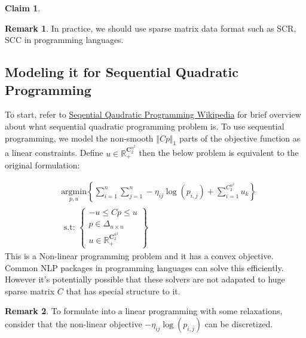 \documentclass[11pt]{article}
\theoremstyle{definition}
\newtheorem{claim}{Claim}[subsection]
\newtheorem{remark}{Remark}[subsection]
{
    \newtheorem{assumption}{Assumption}
}
\numberwithin{equation}{subsection}
\begin{document}
\begin{claim}
        \end{claim}
        \begin{remark}
            In practice, we should use sparse matrix data format such as SCR, SCC in programming languages. 
        \end{remark}
    \subsection{Modeling it for Sequential Quadratic Programming}
    \begin{linenumbers}
        To start, refer to \href{https://en.wikipedia.org/wiki/Sequential_quadratic_programming}{Seqential Qaudratic Programming Wikipedia} for brief overview about what sequential quadratic programming problem is. 
        To use sequential programming, we model the non-smooth $\Vert Cp\Vert_1$ parts of the objective function as a linear constraints. 
        Define $u\in \mathbb R^{\mathbf C^{n^2}_2}_+$ then the below problem is equivalent to the original formulation:
    \end{linenumbers}
        \begin{align}
            &\underset{
                \substack{
                        p, u
                    }
            }{\text{argmin}} 
            \left\lbrace
                \sum_{i = 1}^{n}\sum_{j = 1}^{n}
                    -\eta_{ij}\log(p_{i, j})
                + 
                \sum_{i = 1}^{C_2^{n^2}} u_k
            \right\rbrace
            \\
            &\text{ s.t: }
            \left\lbrace
            \begin{aligned}
                - u \le Cp \le u
                \\
                p \in \Delta_{n\times n}
                \\ 
                u \in \mathbb R^{\mathbf C^{n^2}_2}_+
            \end{aligned}
            \right\rbrace
        \end{align}
        This is a Non-linear programming problem and it has a convex objective. 
        Common NLP packages in programming languages can solve this efficiently. 
        However it's potentially possible that these solvers are not adapated to huge sparse matrix $C$ that has special structure to it. 
        \begin{remark}
            To formulate into a linear programming with some relaxations, consider that the non-linear objective $-\eta_{ij}\log(p_{i,j})$ can be discretized. 
        \end{remark}
\end{document}
